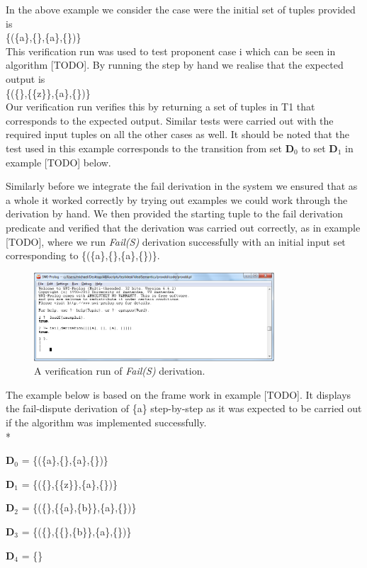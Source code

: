 In the above example we consider the case were the initial set of tuples provided is 
\\

\{(\{a\},\{\},\{a\},\{\})\}
\\

This verification run was used to test proponent case i which can be seen in algorithm [TODO]. By running the step by hand we realise that the expected output is
\\

\{(\{\},\{\{z\}\},\{a\},\{\})\}
\\

Our verification run verifies this by returning a set of tuples in T1 that corresponds to the expected output. Similar tests were carried out with the required input tuples on all the other cases as well. It should be noted that the test used in this example corresponds to the transition from set $\mathbf{D}_0$ to set $\mathbf{D}_1$ in example [TODO] below.

Similarly before we integrate the fail derivation in the system we ensured that as a whole it worked correctly by trying out examples we could work through the derivation by hand. We then provided the starting tuple to the fail derivation predicate and verified that the derivation was carried out correctly, as in example [TODO], where we run \emph{Fail(S)} derivation successfully with an initial input set corresponding to \{(\{a\},\{\},\{a\},\{\})\}.

\begin{figure}[h]
    \centering
    \includegraphics[width=0.8\textwidth]{swiFail.png}
    \caption{A verification run of \emph{Fail(S)} derivation.}
    \label{fig:arg_swi_fail}
\end{figure}

\begin{exmp} The example below is based on the frame work in example [TODO]. It displays the fail-dispute derivation of \{a\} step-by-step as it was expected to be carried out if the algorithm was implemented successfully.
\\*

$\mathbf{D}_0$ = \{(\{a\},\{\},\{a\},\{\})\}

$\mathbf{D}_1$ = \{(\{\},\{\{z\}\},\{a\},\{\})\}

$\mathbf{D}_2$ = \{(\{\},\{\{a\},\{b\}\},\{a\},\{\})\}

$\mathbf{D}_3$ = \{(\{\},\{\{\},\{b\}\},\{a\},\{\})\}

$\mathbf{D}_4$ = \{\}

\end{exmp}

